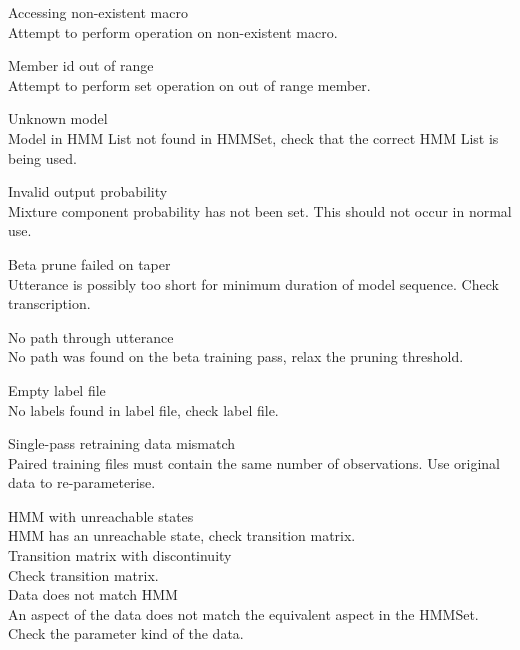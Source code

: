 \begin{itemize}
\begin{itemize}
    Accessing non-existent macro\\
        Attempt to perform operation on non-existent macro.

    Member id out of range\\
        Attempt to perform set operation on out of range member.

\end{itemize}


\begin{itemize}

    Unknown model\\
        Model in HMM List not found in HMMSet, check that the
        correct HMM List is being used.

    Invalid output probability\\
        Mixture component probability has not been set.  This should
        not occur in normal use.

    Beta prune failed on taper\\
        Utterance is possibly too short for minimum duration
        of model sequence. Check transcription.

    No path through utterance\\
        No path was found on the beta training pass, relax the
        pruning threshold.

    Empty label file\\
        No labels found in label file, check label file.

    Single-pass retraining data mismatch\\
        Paired training files must contain the same number of observations.  
        Use original data to re-parameterise.

  HMM with unreachable states\\
        HMM has an unreachable state, check transition matrix.\\

 Transition matrix with discontinuity\\
        Check transition matrix.\\        

    Data does not match HMM\\
        An aspect of the data does not match the equivalent aspect in 
        the HMMSet.  Check the parameter kind of the data.


\end{itemize}
\end{itemize}
